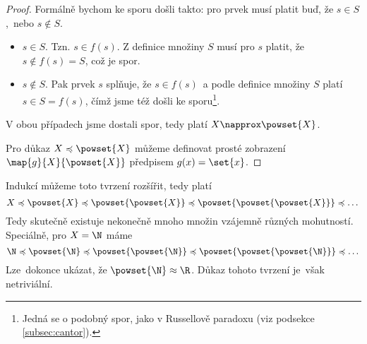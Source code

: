 \begin{proof}
    Formálně bychom ke sporu došli takto: pro prvek musí platit buď, že $s\in S$,~nebo $s\notin S$.
    \begin{itemize}
        \item $s\in S$. Tzn. $s\in f(s)$. Z definice množiny $S$ musí pro $s$ platit, že $s\notin f(s)=S$, což je spor.
        \item $s\notin S$. Pak prvek $s$ splňuje, že $s\in f(s)$~a podle definice množiny $S$ platí $s\in S=f(s)$, čímž jsme též došli ke sporu\footnote{Jedná se o podobný spor, jako v Russellově paradoxu (viz podsekce \ref{subsec:cantor}).}.
    \end{itemize}
    V obou případech jsme dostali spor, tedy platí $X\napprox\powset{X}$.\par
    Pro důkaz $X\preccurlyeq\powset{X}$ můžeme definovat prosté zobrazení $\map{g}{X}{\powset{X}}$ předpisem $g(x)=\set{x}$.
\end{proof}
Indukcí můžeme toto tvrzení rozšířit, tedy platí
\begin{equation*}
    X\preccurlyeq\powset{X}\preccurlyeq\powset{\powset{X}}\preccurlyeq\powset{\powset{\powset{X}}}\preccurlyeq\dots
\end{equation*}
Tedy skutečně existuje nekonečně mnoho množin vzájemně různých mohutností. Speciálně, pro $X=\N$ máme
\begin{equation*}
    \N\preccurlyeq\powset{\N}\preccurlyeq\powset{\powset{\N}}\preccurlyeq\powset{\powset{\powset{\N}}}\preccurlyeq\dots
\end{equation*}
Lze~dokonce ukázat, že $\powset{\N}\approx\R$. Důkaz tohoto tvrzení je~však netriviální.